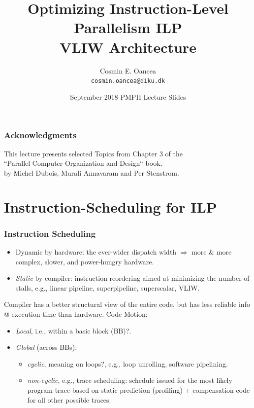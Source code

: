 \documentclass{beamer}
\title[VLIW Arch]{Optimizing Instruction-Level Parallelism ILP\\VLIW Architecture}
\author[C.~Oancea]{Cosmin E. Oancea\\{\tt cosmin.oancea@diku.dk}}
\institute{Department of Computer Science (DIKU)\\University of Copenhagen}
\date[Sept 2018]{September 2018 PMPH Lecture Slides}
\renewcommand{\emph}[1]{\textcolor{structure}{#1}}
\newcommand{\emp}[1]{\textcolor{DikuRed}{ #1}}
\begin{document}
\titleslide



\begin{frame}
\frametitle{Acknowledgments}
This lecture presents selected Topics from Chapter 3 of the\\
``Parallel Computer Organization and Design`` book,\\
by Michel Dubois, Murali Annavaram and Per Stenstrom.
\end{frame}


\begin{frame}[fragile]
	\tableofcontents
\end{frame}


\section{Instruction-Scheduling for ILP}


\begin{frame}[fragile,t]
\frametitle{Instruction Scheduling}

\begin{itemize}
    \item {Dynamic} by hardware: the ever-wider dispatch width
            $\Rightarrow$ 
            more \& more complex, slower, and power-hungry hardware. \smallskip
 
    \item {\em Static} by compiler: instruction reordering aimed at
            minimizing the number of stalls,
            e.g., linear pipeline, superpipeline, superscalar, VLIW.  
\end  {itemize}
\pause\bigskip

Compiler has a better structural view of the entire code, but has less reliable info 
@ execution time than hardware. Code Motion:
\smallskip
\begin{itemize}
    \item \emph{\em Local}, i.e., within a \alert{basic block (BB)?}. 
    \item \emph{\em Global} (across BBs): 
    \begin{itemize}
        \item \emp{\em cyclic}, meaning on \alert{loops?}, e.g., loop unrolling, software pipelining.
        \item \emp{\em non-cyclic}, e.g., trace scheduling: schedule issued for the most likely 
                program trace based on static prediction (profiling) + compensation code 
                for all other possible traces.
    \end  {itemize}
\end  {itemize}

\end{frame}
\end{document}
